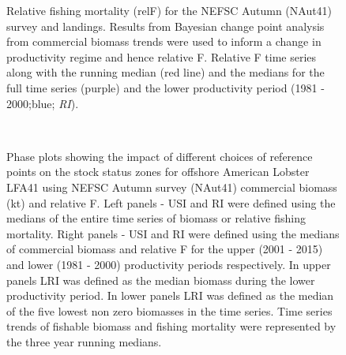 \documentclass[11pt]{article}
\newcommand{\e}{/backup/bio_data/bio.lobster/figures/} %
\begin{document}
\begin{figure}
\centering
       \caption{Relative fishing mortality (relF) for the NEFSC Autumn (NAut41) survey and landings. Results from Bayesian change point analysis from commercial biomass trends were used to inform a change in productivity regime and hence relative F. Relative F time series along with the running median (red line) and the medians for the full time series (purple) and the lower productivity period (1981 - 2000;blue; \emph{RI}). }
\end{figure}


\begin{landscape}
\begin{figure}
\centering
        \\
      

      \caption{Phase plots showing the impact of different choices of reference points on the stock status zones for offshore American Lobster LFA41 using NEFSC Autumn survey (NAut41) commercial biomass (kt) and relative F. Left panels  - USI and RI were defined using the medians of the entire time series of biomass or relative fishing mortality. Right panels - USI and RI were defined using the medians of commercial biomass and relative F for the upper (2001 - 2015) and lower (1981 - 2000) productivity periods respectively. In upper panels LRI was defined as the median biomass during the lower productivity period. In lower panels LRI was defined as the median of the five lowest non zero biomasses in the time series. Time series trends of fishable biomass and fishing mortality were represented by the three year running medians. }

\end{figure}
\end{landscape}
\end{document}
